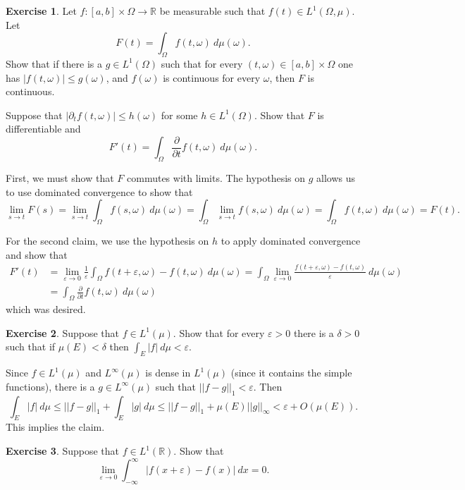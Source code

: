 \documentclass[10pt]{article}
\newcommand{\RR}{\mathbb{R}}
\theoremstyle{definition}
\newtheorem{exer}{Exercise}
\begin{document}
\begin{exer}
Let $f: [a, b] \times \Omega \to \RR$ be measurable such that $f(t) \in L^1(\Omega, \mu)$. Let
$$F(t) = \int_\Omega f(t, \omega)~d\mu(\omega).$$
Show that if there is a $g \in L^1(\Omega)$ such that for every $(t, \omega) \in [a, b] \times \Omega$ one has $|f(t, \omega)| \leq g(\omega)$, and $f(\omega)$ is continuous for every $\omega$, then $F$ is continuous.

Suppose that $|\partial_t f(t, \omega)| \leq h(\omega)$ for some $h \in L^1(\Omega)$. Show that $F$ is differentiable and
$$F'(t) = \int_\Omega \frac{\partial}{\partial t} f(t, \omega)~d\mu(\omega).$$
\end{exer}

First, we must show that $F$ commutes with limits. The hypothesis on $g$ allows us to use dominated convergence to show that
$$\lim_{s \to t} F(s) = \lim_{s \to t} \int_\Omega f(s, \omega)~d\mu(\omega) = \int_\Omega \lim_{s \to t} f(s, \omega) ~d\mu(\omega) = \int_\Omega f(t, \omega) ~d\mu(\omega) = F(t).$$

For the second claim, we use the hypothesis on $h$ to apply dominated convergence and show that
\begin{align*}
F'(t) &= \lim_{\varepsilon \to 0} \frac{1}{\varepsilon} \int_\Omega f(t + \varepsilon, \omega) - f(t, \omega)~d\mu(\omega) = \int_\Omega \lim_{\varepsilon \to 0} \frac{f(t + \varepsilon, \omega) - f(t, \omega)}{\varepsilon}~d\mu(\omega)\\
&= \int_\Omega \frac{\partial}{\partial t} f(t, \omega) ~d\mu(\omega)
\end{align*}
which was desired.

\begin{exer}
Suppose that $f \in L^1(\mu)$. Show that for every $\varepsilon > 0$ there is a $\delta > 0$ such that if $\mu(E) < \delta$ then $\int_E |f|~d\mu < \varepsilon$.
\end{exer}

Since $f \in L^1(\mu)$ and $L^\infty(\mu)$ is dense in $L^1(\mu)$ (since it contains the simple functions), there is a $g \in L^\infty(\mu)$ such that $||f - g||_1 < \varepsilon$. Then
$$\int_E |f|~d\mu \leq ||f - g||_1 + \int_E |g|~d\mu \leq ||f - g||_1 + \mu(E) ||g||_\infty < \varepsilon + O(\mu(E)).$$
This implies the claim.

\begin{exer}
Suppose that $f \in L^1(\RR)$. Show that
$$\lim_{\varepsilon \to 0} \int_{-\infty}^\infty |f(x + \varepsilon) - f(x)|~dx = 0.$$
\end{exer}
\end{document}
